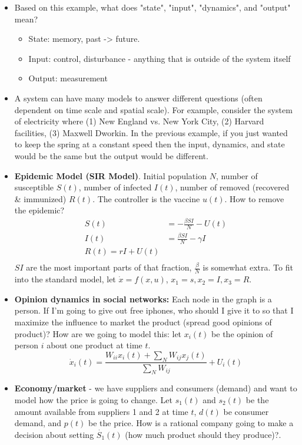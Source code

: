 \documentclass[12pt]{article}
\theoremstyle{definition}
\begin{document}
\begin{itemize}
    \item Based on this example, what does "state", "input", "dynamics", and "output" mean?
    \begin{itemize}
        \item  State: memory, past -> future. 
        \item  Input: control, disturbance - anything that is outside of the system itself
        \item Output: measurement
    \end{itemize}
    \item A system can have many models to answer different questions (often dependent on time scale and spatial scale). For example, consider the system of electricity where (1) New England vs. New York City, (2) Harvard facilities, (3) Maxwell Dworkin. In the previous example, if you just wanted to keep the spring at a constant speed then the input, dynamics, and state would be the same but the output would be different.
    \item \textbf{Epidemic Model (SIR Model)}. Initial population $N$, number of susceptible $S(t)$, number of infected $I(t)$, number of removed (recovered \& immunized) $R(t)$. The controller is the vaccine $u(t)$. How to remove the epidemic?
    \begin{align*}
        S(t) &= - \frac{\beta SI}{N} - U(t) \\
        I(t) &= \frac{\beta SI}{N} - \gamma I \\
        R(t) = rI + U(t) \\
    \end{align*}
    $SI$ are the most important parts of that fraction, $\frac{\beta}{N}$ is somewhat extra. To fit into the standard model, let $\dot{x} = f(x, u)$, $x_1 = s, x_2 = I, x_3 = R$.
    \item \textbf{Opinion dynamics in social networks:} Each node in the graph is a person. If I'm going to give out free iphones, who should I give it to so that I maximize the influence to market the product (spread good opinions of product)? How are we going to model this: let $x_i(t)$ be the opinion of person $i$ about one product at time $t$.
    $$\dot{x}_i(t) = \frac{W_{ii} x_i(t) + \sum_N W_{ij} x_j(t)}{\sum_N W_{ij}} + U_i(t)$$
    \item \textbf{Economy/market} - we have suppliers and consumers (demand) and want to model how the price is going to change. Let $s_1(t)$ and $s_2(t)$ be the amount available from suppliers 1 and 2 at time $t$, $d(t)$ be consumer demand, and $p(t)$ be the price. How is a rational company going to make a decision about setting $\dot{S_1}(t)$ (how much product should they produce)?.

\end{itemize}
\end{document}

